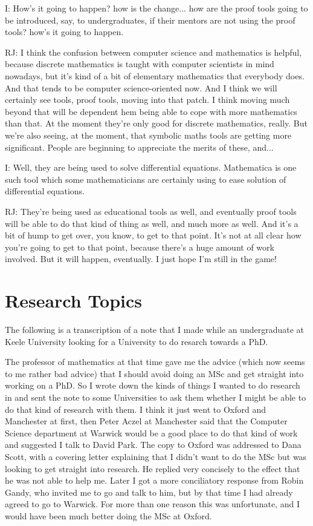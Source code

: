 \documentclass[10pt,titlepage]{book}
\begin{document}
I: How's it going to happen?  how is the change... how are the proof tools going to be introduced, say, to undergraduates, if their mentors are not using the proof tools?  how's it going to happen.

RJ: I think the confusion between computer science and mathematics is helpful, because discrete mathematics is taught with computer scientists in mind nowadays, but it's kind of a bit of elementary mathematics that everybody does. And that tends to be computer science-oriented now. And I think we will certainly see tools, proof tools, moving into that patch. I think moving much beyond that will be dependent hem being able to cope with more mathematics than that. At the moment they're only good for discrete mathematics, really. But we're also seeing, at the moment, that symbolic maths tools are getting more significant. People are beginning to appreciate the merits of these, and...

I: Well, they are being used to solve differential equations. Mathematica is one such tool which some mathematicians are certainly using to ease solution of differential equations.

RJ: They're being used as educational tools as well, and eventually proof tools will be able to do that kind of thing as well, and much more as well. And it's a bit of hump to get over, you know, to get to that point. It's not at all clear how you're going to get to that point, because there's a huge amount of work involved. But it will happen, eventually. I just hope I'm still in the game!

\chapter{Research Topics}\label{ResearchTopics}

The following is a transcription of a note that I made while an undergraduate at Keele University looking for a University to do resarch towards a PhD.

The professor of mathematics at that time gave me the advice (which now seems to me rather bad advice) that I should avoid doing an MSc and get straight into working on a PhD.
So I wrote down the kinds of things I wanted to do research in and sent the note to some Universities to ask them whether I might be able to do that kind of research with them.
I think it just went to Oxford and Manchester at first, then Peter Aczel at Manchester said that the Computer Science department at Warwick would be a good place to do that kind of work and suggested I talk to David Park.
The copy to Oxford was addressed to Dana Scott, with a covering letter explaining that I didn't want to do the MSc but was looking to get straight into research.
He replied very concisely to the effect that he was not able to help me.
Later I got a more conciliatory response from Robin Gandy, who invited me to go and talk to him, but by that time I had already agreed to go to Warwick.
For more than one reason this was unfortunate, and I would have been much better doing the MSc at Oxford.
\end{document}
